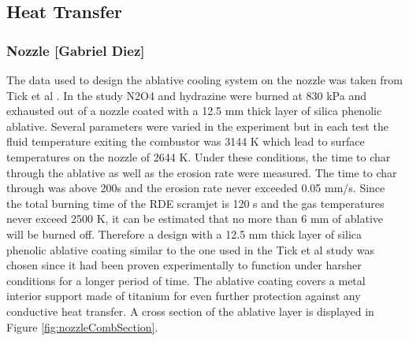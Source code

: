\subsection{Heat Transfer}


\subsubsection{Nozzle [Gabriel Diez]}

The data used to design the ablative cooling system on the nozzle was taken from Tick et al \cite{tick}. In the study N2O4 and hydrazine were burned at 830 kPa and exhausted out of a nozzle coated with a 12.5 mm thick layer of silica phenolic ablative. Several parameters were varied in the experiment but in each test the fluid temperature exiting the combustor was 3144 K which lead to surface temperatures on the nozzle of 2644 K. Under these conditions, the time to char through the ablative as well as the erosion rate were measured. The time to char through was above 200s and the erosion rate never exceeded 0.05 mm/s. Since the total burning time of the RDE scramjet is 120 s and the gas temperatures never exceed 2500 K, it can be estimated that no more than 6 mm of ablative will be burned off. Therefore a design with a 12.5 mm thick layer of silica phenolic ablative coating similar to the one used in the Tick et al \cite{tick} study was chosen since it had been proven experimentally to function under harsher conditions for a longer period of time. The ablative coating covers a metal interior support made of titanium for even further protection against any conductive heat transfer. A cross section of the ablative layer is displayed in Figure \ref{fig:nozzleCombSection}.



